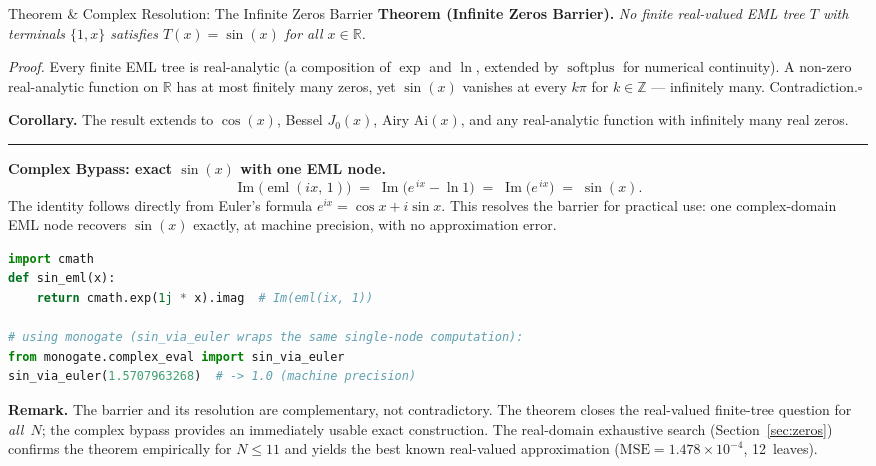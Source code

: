 \documentclass[11pt,a4paper]{article}
\begin{document}
\begin{emlbox}{Theorem \& Complex Resolution: The Infinite Zeros Barrier}
\textbf{Theorem (Infinite Zeros Barrier).}\quad
\textit{No finite real-valued EML tree $T$ with terminals $\{1,x\}$
satisfies $T(x)=\sin(x)$ for all $x\in\mathbb{R}$.}

\smallskip
\textit{Proof.}\;
Every finite EML tree is real-analytic (a composition of $\exp$ and
$\ln$, extended by $\operatorname{softplus}$ for numerical continuity).
A non-zero real-analytic function on $\mathbb{R}$ has at most finitely
many zeros, yet $\sin(x)$ vanishes at every $k\pi$ for $k\in\mathbb{Z}$
--- infinitely many.
Contradiction.\hfill$\square$

\medskip
\textbf{Corollary.}\quad
The result extends to $\cos(x)$, Bessel $J_0(x)$, Airy $\mathrm{Ai}(x)$,
and any real-analytic function with infinitely many real zeros.

\bigskip
\hrule height 0.4pt
\bigskip

\textbf{Complex Bypass: exact $\sin(x)$ with one EML node.}\quad
\[
  \operatorname{Im}\!\bigl(\operatorname{eml}(ix,\,1)\bigr)
  \;=\;
  \operatorname{Im}\!\bigl(e^{\,ix} - \ln 1\bigr)
  \;=\;
  \operatorname{Im}\!\bigl(e^{\,ix}\bigr)
  \;=\;
  \sin(x).
\]
The identity follows directly from Euler's formula
$e^{ix} = \cos x + i\sin x$.
This resolves the barrier for practical use:
one complex-domain EML node recovers $\sin(x)$ exactly,
at machine precision, with no approximation error.

\smallskip
\begin{lstlisting}[language=Python, belowskip=-4pt]
import cmath
def sin_eml(x):
    return cmath.exp(1j * x).imag  # Im(eml(ix, 1))

# using monogate (sin_via_euler wraps the same single-node computation):
from monogate.complex_eval import sin_via_euler
sin_via_euler(1.5707963268)  # -> 1.0 (machine precision)
\end{lstlisting}

\smallskip
\textbf{Remark.}\;
The barrier and its resolution are complementary, not contradictory.
The theorem closes the real-valued finite-tree question for \emph{all}~$N$;
the complex bypass provides an immediately usable exact construction.
The real-domain exhaustive search (Section~\ref{sec:zeros}) confirms
the theorem empirically for $N\leq11$ and yields the best known
real-valued approximation ($\mathrm{MSE}=1.478\times10^{-4}$,
12~leaves).
\end{emlbox}

\end{document}

